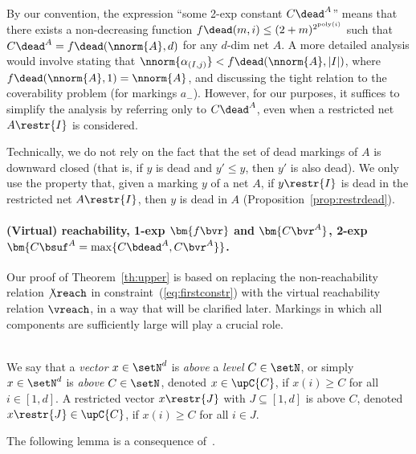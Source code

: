 \begin{rem}
By our convention, the expression ``some 2-exp constant $C\dead^A$''
	means that there exists a non-decreasing function $f\dead(m,i)\leq
	(2+m)^{2^{\text{poly}(i)}}$
such that $C\dead^A=f\dead(\nnorm{A},d)$ for
any $d$-dim net $A$.
A more detailed analysis would involve stating
that	$\nnorm{\alpha_{(I,j)}}< f\dead(\nnorm{A},|I|)$, where 
	$f\dead(\nnorm{A},1)=\nnorm{A}$, and discussing the tight
	relation to the coverability problem (for markings $a_-$). 
	However, for our  purposes, it suffices to simplify the
	analysis by referring only to
	$C\dead^A$, even when a restricted net $A\restr{I}$ is
	considered.

	Technically, we do not rely on the fact that the set of dead
	markings of $A$ is downward closed (that is, if $y$ is dead and $y'\leq y$,
	then $y'$ is also dead). We only use the property that,
	given a marking $y$ of a net $A$, 
if $y\restr{I}$ is dead in the
	restricted net $A\restr{I}$, then $y$ is dead in $A$
	(Proposition~\ref{prop:restrdead}).
\end{rem}

\paragraph{(Virtual) reachability, 1-exp
$\bm{f\bvr}$ and $\bm{C\bvr^A}$, 2-exp $\bm{C\bsuf^A=\max\{C\bdead^A,C\bvr^A\}}$.}
Our proof of Theorem~\ref{th:upper} is based on replacing
the non-reachability relation $\not\reach$ in 
constraint~(\ref{eq:firstconstr}) with the virtual reachability relation
$\vreach$, in a way that will be clarified later. 
Markings in which all components are sufficiently large will play a
crucial role.

\begin{defi}
\hfill\\
We say that a \emph{vector} $x\in\setN^d$ is \emph{above} a
\emph{level} $C\in\setN$, or simply
$x\in\setN^d$ is \emph{above} $C\in\setN$, denoted
 $x\in\upC{C}$,	if $x(i)\geq C$ for all $i\in[1,d]$.
	A restricted vector
	$x\restr{J}$ with 
	$J\subseteq[1,d]$ is above $C$,
	denoted $x\restr{J}\in\upC{C}$, if  $x(i)\geq C$ for all $i\in
	J$.
\end{defi}

\noindent
The following lemma is a consequence of~\cite[Lemma~5]{DBLP:conf/fsttcs/Leroux19}.


